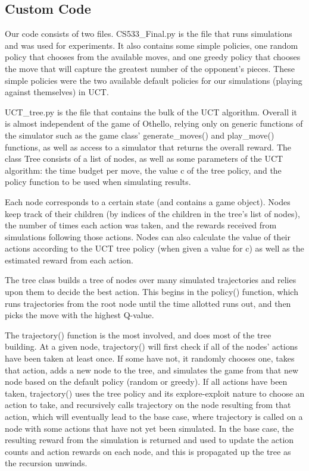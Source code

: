 \documentclass[12pt,letterpaper]{article}
\begin{document}
\subsection{Custom Code}

Our code consists of two files. CS533\_Final.py is the file that runs simulations and was used for experiments. It also contains some simple policies, one random policy that chooses from the available moves, and one greedy policy that chooses the move that will capture the greatest number of the opponent's pieces. These simple policies were the two available default policies for our simulations (playing against themselves) in UCT.

UCT\_tree.py is the file that contains the bulk of the UCT algorithm. Overall it is almost independent of the game of Othello, relying only on generic functions of the simulator such as the game class' generate\_moves() and play\_move() functions, as well as access to a simulator that returns the overall reward. The class Tree consists of a list of nodes, as well as some parameters of the UCT algorithm: the time budget per move, the value c of the tree policy, and the policy function to be used when simulating results.

Each node corresponds to a certain state (and contains a game object). Nodes keep track of their children (by indices of the children in the tree's list of nodes), the number of times each action was taken, and the rewards received from simulations following those actions. Nodes can also calculate the value of their actions according to the UCT tree policy (when given a value for c) as well as the estimated reward from each action.

The tree class builds a tree of nodes over many simulated trajectories and relies upon them to decide the best action. This begins in the policy() function, which runs trajectories from the root node until the time allotted runs out, and then picks the move with the highest Q-value.

The trajectory() function is the most involved, and does most of the tree building. At a given node, trajectory() will first check if all of the nodes' actions have been taken at least once. If some have not, it randomly chooses one, takes that action, adds a new node to the tree, and simulates the game from that new node based on the default policy (random or greedy). If all actions have been taken, trajectory() uses the tree policy and its explore-exploit nature to choose an action to take, and recursively calls trajectory on the node resulting from that action, which will eventually lead to the base case, where trajectory is called on a node with some actions that have not yet been simulated. In the base case, the resulting reward from the simulation is returned and used to update the action counts and action rewards on each node, and this is propagated up the tree as the recursion unwinds.
\end{document}
